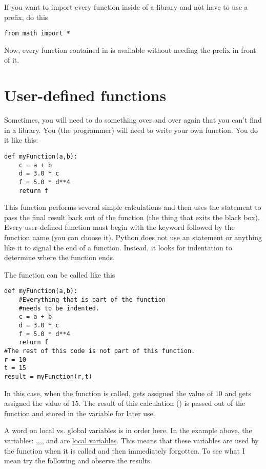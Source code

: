 If you want to import every function inside of a library and not have to use a prefix, do this
\begin{Verbatim}
from math import *
\end{Verbatim}
Now, every function contained in  is available without
needing the  prefix in front of it.

\section{User-defined functions}
Sometimes, you will need to do something over and over again that you
can't find in a library.  You (the programmer) will need to write your
own function. You do it like this:
\begin{Verbatim}
def myFunction(a,b):
    c = a + b
    d = 3.0 * c
    f = 5.0 * d**4
    return f
\end{Verbatim}
This function performs several simple calculations and then uses the
 statement to pass the final result back out of the
function (the thing that exits the black box). Every user-defined function must
begin with the keyword  followed by the function name (you
can choose it). Python does not use an  statement or
anything like it to signal the end of a function.  Instead, it looks
for indentation to determine where the function ends.


The function can be called like this
\begin{Verbatim}
def myFunction(a,b):
    #Everything that is part of the function
    #needs to be indented.
    c = a + b
    d = 3.0 * c
    f = 5.0 * d**4
    return f
#The rest of this code is not part of this function.
r = 10
t = 15
result = myFunction(r,t)
\end{Verbatim}
In this case, when the function is called,  gets assigned the
value of $10$ and  gets assigned the value of $15$.  The
result of this calculation () is passed out of the function
and stored in the variable  for later use.


A word on local vs. global variables is in order here.  In the example
above, the variables: ,,,, and
 are \ul{local variables}.  This means that these variables
are used by the function when it is called and then immediately
forgotten.  To see what I mean try the following and observe the
results

